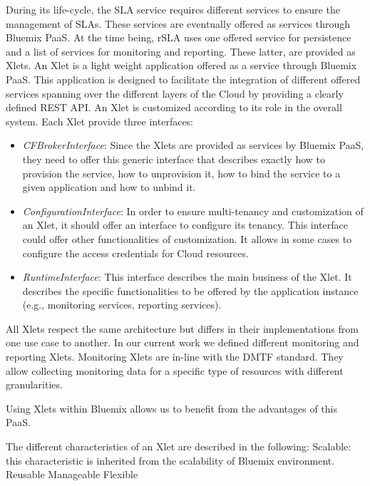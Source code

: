 During its life-cycle, the SLA service requires different services to ensure the management of 
SLAs. These services are eventually offered as services through Bluemix PaaS. At the time being, 
rSLA uses one offered service for persistence and a list of services for monitoring and reporting. 
These latter, are provided as Xlets. An Xlet is a light weight application offered as a service 
through Bluemix PaaS. This application is designed to facilitate the integration of different 
offered services spanning over the different layers of the Cloud by providing a clearly defined REST 
API. An Xlet is customized according to its role in the overall system. Each Xlet provide three 
interfaces:
\begin{itemize}
 \item \emph{CFBrokerInterface}: Since the Xlets are provided as services by Bluemix PaaS, they need 
to offer this generic interface that describes exactly how to provision the service, how to 
unprovision it, how to bind the service to a given application and how to unbind it.
 \item  \emph{ConfigurationInterface}: In order to ensure multi-tenancy and customization of an 
Xlet, it should offer an interface to configure its tenancy. This interface could offer other 
functionalities of customization. It allows in some cases to configure the access credentials for 
Cloud resources.
 \item  \emph{RuntimeInterface}: This interface describes the main business of the Xlet. It 
describes the specific functionalities to be offered by the application instance (e.g., monitoring 
services, reporting services). 
\end{itemize}

All Xlets respect the same architecture but differs in their implementations from one use case to 
another. In our current work we defined different monitoring and reporting Xlets. Monitoring Xlets 
are in-line with the DMTF standard. They allow collecting monitoring data for a specific type of 
resources with different granularities.  


Using Xlets within Bluemix allows us to benefit from the advantages of this PaaS. 

The different characteristics of an Xlet are described in the following:
Scalable: this characteristic is inherited from the scalability of Bluemix environment.
Reusable 
Manageable
Flexible

